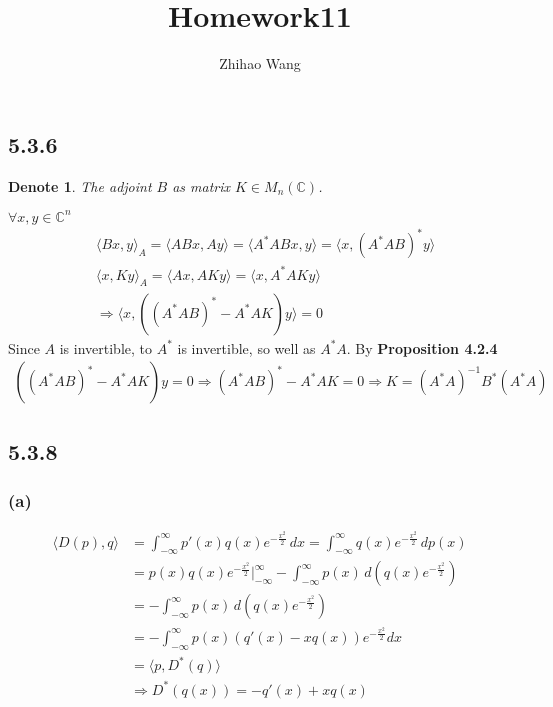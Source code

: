 \documentclass{article}
\title{Homework11}
\author{Zhihao Wang}
\newtheorem*{denote}{Denote}
\begin{document}
\maketitle 

\subsection*{5.3.6}
\begin{denote}
    The adjoint $B$ as matrix $K \in M_n\mathbb{(C)}$.
\end{denote}
$\forall x, y \in \mathbb{C}^n$
\begin{equation*}
    \begin{split}
         & \langle Bx, y \rangle_A = \langle ABx, Ay \rangle = \langle A^*ABx, y \rangle = \langle x, (A^*AB)^*y \rangle \\
         & \langle x, Ky \rangle_A = \langle Ax, AKy \rangle = \langle x, A^*AKy \rangle \\
         & \Rightarrow \langle x, ((A^*AB)^* - A^*AK)y \rangle = 0
    \end{split}
\end{equation*}
Since $A$ is invertible, to $A^*$ is invertible, so well as $A^*A$. By \textbf{Proposition 4.2.4}
\begin{equation*}
    \begin{split}
        ((A^*AB)^* - A^*AK)y = 0 \Rightarrow (A^*AB)^* - A^*AK = 0 \Rightarrow K = (A^*A)^{-1}B^*(A^*A)
    \end{split}
\end{equation*}

\subsection*{5.3.8}
\subsubsection*{(a)}
\begin{equation*}
    \begin{split}
        \langle D(p), q \rangle & = \int_{- \infty}^{\infty} p'(x)q(x)e^{- \frac{x^2}{2}} \,dx = \int_{- \infty}^{\infty} q(x)e^{- \frac{x^2}{2}} \,d p(x) \\
        & = p(x)q(x)e^{- \frac{x^2}{2}} |_{- \infty}^{\infty} - \int_{- \infty}^{\infty} p(x) \,d (q(x)e^{- \frac{x^2}{2}}) \\
        & = - \int_{- \infty}^{\infty} p(x) \,d (q(x)e^{- \frac{x^2}{2}})
        \\ & = - \int_{- \infty}^{\infty} p(x)(q'(x) - xq(x))e^{- \frac{x^2}{2}}dx
        \\ & = \langle p, D^*(q) \rangle
        \\ & \Rightarrow D^*(q(x)) =  -q'(x) + xq(x)
    \end{split}
\end{equation*}
\end{document}
